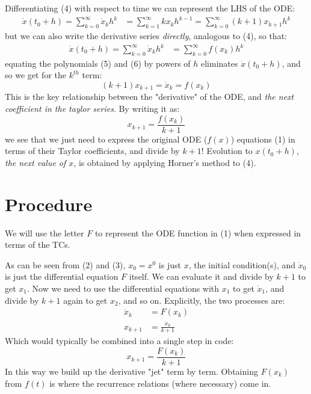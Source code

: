 \documentclass[11pt]{article}
\begin{document}
Differentiating (4) with respect to time we can represent the LHS of the ODE:
\begin{equation}
\begin{aligned}
\dot{x}(t_0+h) = \sum_{k=0}^{\infty} \dot{x}_kh^k &= \sum_{k=1}^{\infty} k x_kh^{k-1} = \sum_{k=0}^{\infty} (k + 1) x_{k+1}h^k
\end{aligned}
\end{equation}
but we can also write the derivative series \textit{directly}, analogous to  (4), so that:
\begin{equation}
\begin{aligned}
\dot{x}(t_0+h) = \sum_{k=0}^{\infty} \dot{x}_kh^k &= \sum_{k=0}^{\infty} f({x}_k)h^k
\end{aligned}
\end{equation}
equating the polynomials (5) and (6) by powers of $h$ eliminates $\dot{x}(t_0+h)$, and so we get for the $k^{th}$ term:
\begin{equation}
(k + 1) x_{k+1} = \dot{x}_k = f(x_k)
\end{equation}
This is the key relationship between the "derivative" of the ODE, and \textit{the next coefficient in the taylor series}.
By writing it as:
\begin{equation}
x_{k+1} = \frac{f({x}_k)} {k + 1}
\end{equation}
we see that we just need to express the original ODE ($f(x)$) equations (1) in terms of their Taylor coefficients, and divide by $k + 1$!
Evolution to $x(t_0 + h)$, \textit{the next value of $x$}, is obtained by applying Horner's method to (4).
\section{Procedure}
We will use the letter $F$ to represent the ODE function in (1) when expressed in terms of the TCs.

As can be seen from (2) and (3), $x_0 = x^0$ is just $x$, the initial condition(s), and $\dot{x}_0$ is just the differential equation $F$ itself.
We can evaluate it and divide by $k + 1$ to get $x_1$.
Now we need to use the differential equations with $x_1$ to get $\dot{x}_1$, and divide by $k + 1$ again to get $x_2$, and so on.  Explicitly, the two processes are:
\begin{equation}
\begin{aligned}
\dot{x}_k &= F(x_k) \\
x_{k+1} &= \frac{\dot{x}_k} {k + 1}
\end{aligned}
\end{equation}
Which would typically be combined into a single step in code:
\begin{equation}
x_{k+1} = \frac{F(x_k)} {k + 1}
\end{equation}
In this way we build up the derivative "jet" term by term.
Obtaining $F(x_k)$ from $f(t)$ is where the recurrence relations (where necessary) come in.
\end{document}
